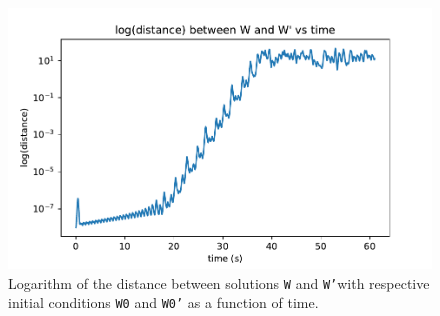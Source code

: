 \documentclass[a4paper,11pt]{article}
\theoremstyle{plain}
\theoremstyle{definition}
\theoremstyle{remark}
\begin{document}
\begin{figure}[H]
    \centering
    \includegraphics[width=\linewidth]{../plots/a3q2_dist_vs_t.pdf}
    \caption{Logarithm of the distance between solutions \texttt{W} and
    \texttt{W'}with respective initial conditions \texttt{W0} 
    and \texttt{W0'} as a function of time.}
    \label{q2:3}
\end{figure}
\end{document}
